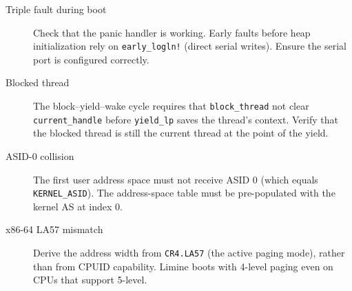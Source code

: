 \begin{description}
    \item[Triple fault during boot] Check that the panic handler is working.
        Early faults before heap initialization rely on
        \texttt{early\_logln!} (direct serial writes). Ensure the serial port
        is configured correctly.
    \item[Blocked thread] The block--yield--wake cycle requires
        that \texttt{block\_thread} not clear \texttt{current\_handle} before
        \texttt{yield\_lp} saves the thread's context. Verify that the
        blocked thread is still the current thread at the point of the yield.
    \item[ASID-0 collision] The first user address space must not receive
        ASID 0 (which equals \texttt{KERNEL\_ASID}). The address-space table
        must be pre-populated with the kernel AS at index 0.
    \item[x86-64 LA57 mismatch] Derive the address width from
        \texttt{CR4.LA57} (the active paging mode), rather than from CPUID capability.
        Limine boots with 4-level paging even on CPUs that support 5-level.
\end{description}

\endinput
